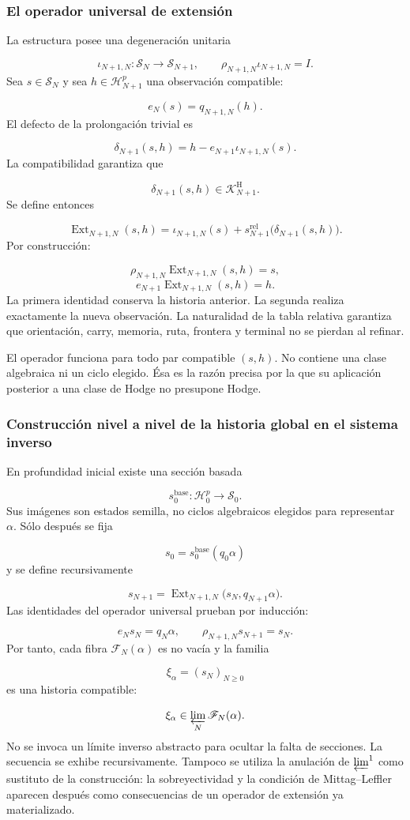 \subsubsection{El operador universal de extensión}
La estructura posee una degeneración unitaria\par
\[
\iota_{N+1,N}:\mathscr S_N\longrightarrow\mathscr S_{N+1},
\qquad
\rho_{N+1,N}\iota_{N+1,N}=I.
\]
Sea \(s\in\mathscr S_N\) y sea \(h\in\mathscr H_{N+1}^p\) una observación compatible:\par
\[
e_N(s)=q_{N+1,N}(h).
\]
El defecto de la prolongación trivial es\par
\[
\delta_{N+1}(s,h)
=
h-e_{N+1}\iota_{N+1,N}(s).
\]
La compatibilidad garantiza que\par
\[
\delta_{N+1}(s,h)
\in
\mathscr K_{N+1}^{\mathrm H}.
\]
Se define entonces\par
\[
\operatorname{Ext}_{N+1,N}(s,h)
=
\iota_{N+1,N}(s)
+
s_{N+1}^{\mathrm{rel}}
\bigl(\delta_{N+1}(s,h)\bigr).
\]
Por construcción:\par
\[
\rho_{N+1,N}
\operatorname{Ext}_{N+1,N}(s,h)
=s,
\]
\[
e_{N+1}
\operatorname{Ext}_{N+1,N}(s,h)
=h.
\]
La primera identidad conserva la historia anterior. La segunda realiza exactamente la nueva observación. La naturalidad de la tabla relativa garantiza que orientación, carry, memoria, ruta, frontera y terminal no se pierdan al refinar.\par
El operador funciona para todo par compatible \((s,h)\). No contiene una clase algebraica ni un ciclo elegido. Ésa es la razón precisa por la que su aplicación posterior a una clase de Hodge no presupone Hodge.\par
{}
\subsubsection{Construcción nivel a nivel de la historia global en el sistema inverso}
En profundidad inicial existe una sección basada\par
\[
s_0^{\mathrm{base}}:
\mathscr H_0^p\longrightarrow\mathscr S_0.
\]
Sus imágenes son estados semilla, no ciclos algebraicos elegidos para representar \(\alpha\). Sólo después se fija\par
\[
s_0=s_0^{\mathrm{base}}(q_0\alpha)
\]
y se define recursivamente\par
\[
s_{N+1}
=
\operatorname{Ext}_{N+1,N}
\bigl(s_N,q_{N+1}\alpha\bigr).
\]
Las identidades del operador universal prueban por inducción:\par
\[
e_Ns_N=q_N\alpha,
\qquad
\rho_{N+1,N}s_{N+1}=s_N.
\]
Por tanto, cada fibra \(\mathscr F_N(\alpha)\) es no vacía y la familia\par
\[
\xi_\alpha=(s_N)_{N\ge0}
\]
es una historia compatible:\par
\[
\xi_\alpha
\in
\varprojlim_N\mathscr F_N(\alpha).
\]
No se invoca un límite inverso abstracto para ocultar la falta de secciones. La secuencia se exhibe recursivamente. Tampoco se utiliza la anulación de \(\varprojlim^1\) como sustituto de la construcción: la sobreyectividad y la condición de Mittag–Leffler aparecen después como consecuencias de un operador de extensión ya materializado.\par
{}
